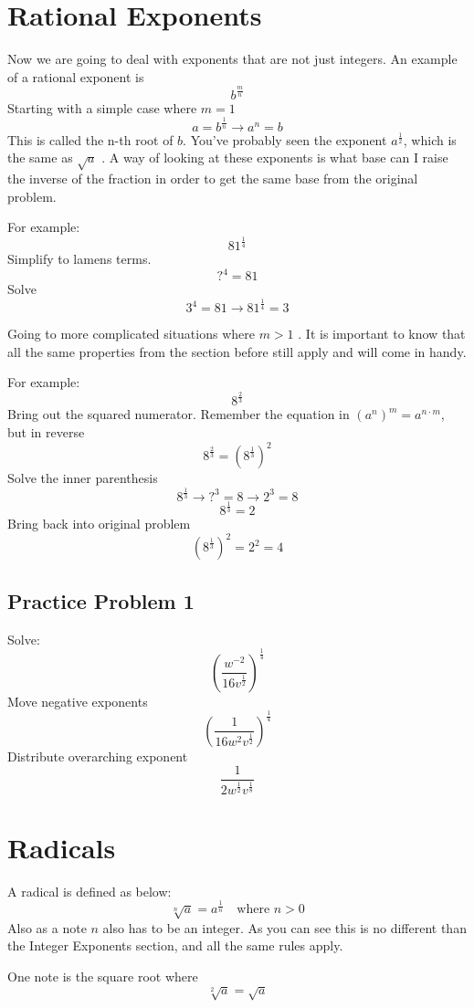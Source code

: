 \documentclass[12pt, letterpaper, oneside]{book}
\begin{document}
\section{Rational Exponents}
Now we are going to deal with exponents that are not just integers. An example of a rational exponent is
\[b^{\frac{m}{n}}\]
Starting with a simple case where $m = 1$
\[a = b^{\frac{1}{n}} \rightarrow a^n = b\]
This is called the n-th root of $b$. You've probably seen the exponent $a^{\frac{1}{2}}$, which is the same as $\sqrt{a}$ . A way of looking at these exponents is what base can I raise the inverse of the fraction in order to get the same base from the original problem.

For example:
\[81^{\frac{1}{4}}\]
Simplify to lamens terms.
\[?^{4} = 81\]
Solve
\[3^4 = 81 \rightarrow 81^{\frac{1}{4}} = 3\]

Going to more complicated situations where $m > 1$ .
It is important to know that all the same properties from the section before still apply and will come in handy.

For example:
\[8^{\frac{2}{3}}\]
Bring out the squared numerator. Remember the equation in $(a^n)^m = a^{n \cdot m}$, but in reverse
\[ 8^{\frac{2}{3}} = \left( 8^{\frac{1}{3}} \right)^2 \]
Solve the inner parenthesis
\[ 8^{\frac{1}{3}} \rightarrow ?^3 = 8 \rightarrow 2^3 = 8\]
\[ 8^{\frac{1}{3}} = 2\]
Bring back into original problem
\[\left( 8^{\frac{1}{3}} \right)^2 = 2^2 = 4\]

\subsection{Practice Problem 1}
Solve:
\[\left( \frac{w^{-2}}{16v^{\frac{1}{2}}} \right) ^ {\frac{1}{4}}\]
Move negative exponents
\[\left( \frac{1}{16w^{2}v^{\frac{1}{2}}} \right) ^ {\frac{1}{4}}\]
Distribute overarching exponent
\[\frac{1}{2w^{\frac{1}{2}}v^{\frac{1}{8}}}\]

\section{Radicals}
A radical is defined as below:
\begin{equation}
    \sqrt[n]{a} = a^{\frac{1}{n}} \quad \text{where } n > 0
\end{equation}
Also as a note $n$ also has to be an integer. As you can see this is no different than the Integer Exponents section, and all the same rules apply.

One note is the square root where
\[ \sqrt[2]{a} = \sqrt{a} \]
\end{document}
